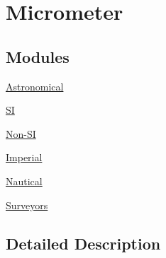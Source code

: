 \hypertarget{group___e_g_x_math-_conversions-_length_conversions-_s_i-_micrometer}{}\section{Micrometer}
\label{group___e_g_x_math-_conversions-_length_conversions-_s_i-_micrometer}
\subsection*{Modules}
\begin{DoxyCompactItemize}
\item 
\mbox{\hyperlink{group___e_g_x_math-_conversions-_length_conversions-_s_i-_micrometer-_astronomical}{Astronomical}}
\item 
\mbox{\hyperlink{group___e_g_x_math-_conversions-_length_conversions-_s_i-_micrometer-_s_i}{SI}}
\item 
\mbox{\hyperlink{group___e_g_x_math-_conversions-_length_conversions-_s_i-_micrometer-_non-_s_i}{Non-\/\+SI}}
\item 
\mbox{\hyperlink{group___e_g_x_math-_conversions-_length_conversions-_s_i-_micrometer-_imperial}{Imperial}}
\item 
\mbox{\hyperlink{group___e_g_x_math-_conversions-_length_conversions-_s_i-_micrometer-_nautical}{Nautical}}
\item 
\mbox{\hyperlink{group___e_g_x_math-_conversions-_length_conversions-_s_i-_micrometer-_surveyors}{Surveyors}}
\end{DoxyCompactItemize}


\subsection{Detailed Description}
